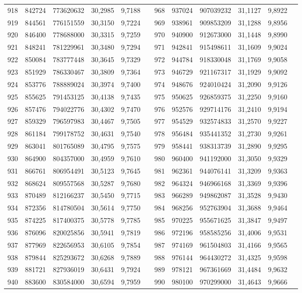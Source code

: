 \begin{longtable}{p{.17\linewidth}*{11}{S}}
918&842724&773620632&30,2985&9,7188&&968&937024&907039232&31,1127&9,8922\\
919&844561&776151559&30,3150&9,7224&&969&938961&909853209&31,1288&9,8956\\
920&846400&778688000&30,3315&9,7259&&970&940900&912673000&31,1448&9,8990\\
921&848241&781229961&30,3480&9,7294&&971&942841&915498611&31,1609&9,9024\\
922&850084&783777448&30,3645&9,7329&&972&944784&918330048&31,1769&9,9058\\
923&851929&786330467&30,3809&9,7364&&973&946729&921167317&31,1929&9,9092\\
924&853776&788889024&30,3974&9,7400&&974&948676&924010424&31,2090&9,9126\\
925&855625&791453125&30,4138&9,7435&&975&950625&926859375&31,2250&9,9160\\
926&857476&794022776&30,4302&9,7470&&976&952576&929714176&31,2410&9,9194\\
927&859329&796597983&30,4467&9,7505&&977&954529&932574833&31,2570&9,9227\\
928&861184&799178752&30,4631&9,7540&&978&956484&935441352&31,2730&9,9261\\
929&863041&801765089&30,4795&9,7575&&979&958441&938313739&31,2890&9,9295\\
930&864900&804357000&30,4959&9,7610&&980&960400&941192000&31,3050&9,9329\\
931&866761&806954491&30,5123&9,7645&&981&962361&944076141&31,3209&9,9363\\
932&868624&809557568&30,5287&9,7680&&982&964324&946966168&31,3369&9,9396\\
933&870489&812166237&30,5450&9,7715&&983&966289&949862087&31,3528&9,9430\\
934&872356&814780504&30,5614&9,7750&&984&968256&952763904&31,3688&9,9464\\
935&874225&817400375&30,5778&9,7785&&985&970225&955671625&31,3847&9,9497\\
936&876096&820025856&30,5941&9,7819&&986&972196&958585256&31,4006&9,9531\\
937&877969&822656953&30,6105&9,7854&&987&974169&961504803&31,4166&9,9565\\
938&879844&825293672&30,6268&9,7889&&988&976144&964430272&31,4325&9,9598\\
939&881721&827936019&30,6431&9,7924&&989&978121&967361669&31,4484&9,9632\\
940&883600&830584000&30,6594&9,7959&&990&980100&970299000&31,4643&9,9666\\

\end{longtable}
